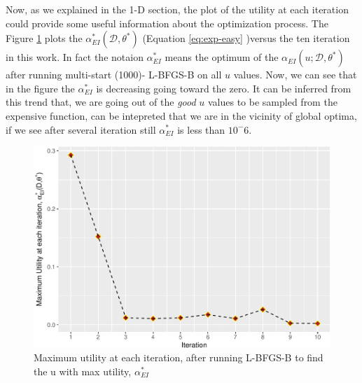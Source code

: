 \documentclass[]{elsarticle} %
\begin{document}
\begin{eqution}
Now, as we explained in the 1-D section, the plot of the utility at each iteration could provide some useful information about the optimization process. The Figure \ref{fig:utilitycurve} plots the \(\alpha_{EI}^*(\mathcal{D}, \theta^*)\) (Equation \eqref{eq:exp-easy} )versus the ten iteration in this work. In fact the notaion \(\alpha_{EI}^*\) means the optimum of the \(\alpha_{EI}(u;\mathcal{D},\theta^*)\) after running multi-start (1000)- L-BFGS-B on all \(u\) values. Now, we can see that in the figure the \(\alpha_{EI}^*\) is decreasing going toward the zero. It can be inferred from this trend that, we are going out of the \emph{good} \(u\) values to be sampled from the expensive function, can be intepreted that we are in the vicinity of global optima, if we see after several iteration still \(\alpha_{EI}^*\) is less than \(10^-6\).

\begin{figure}

{\centering \includegraphics[width=468px]{0_Paper1_main_files/figure-latex/utilitycurve-1} 

}

\caption{Maximum utility at each iteration, after running L-BFGS-B to find the u with max utility, $\alpha_{EI}^*$}\label{fig:utilitycurve}
\end{figure}


\end{eqution}
\end{document}
